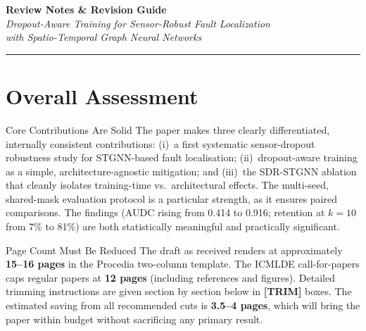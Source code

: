 \documentclass[11pt,a4paper]{article}
\begin{document}
\begin{center}
  {\Large\bfseries Review Notes \& Revision Guide}\\[4pt]
  {\large\itshape Dropout-Aware Training for Sensor-Robust Fault Localization\\
  with Spatio-Temporal Graph Neural Networks}\\[6pt]
\end{center}

\vspace{6pt}
\hrule
\vspace{10pt}

\section{Overall Assessment}

\begin{okbox}{Core Contributions Are Solid}
The paper makes three clearly differentiated, internally consistent contributions:
(i)~a first systematic sensor-dropout robustness study for STGNN-based fault
localisation; (ii)~dropout-aware training as a simple, architecture-agnostic
mitigation; and (iii)~the SDR-STGNN ablation that cleanly isolates training-time
vs.\ architectural effects. The multi-seed, shared-mask evaluation protocol is a
particular strength, as it ensures paired comparisons. The findings (AUDC rising
from 0.414 to 0.916; retention at $k{=}10$ from 7\% to 81\%) are both
statistically meaningful and practically significant.
\end{okbox}

\begin{warnbox}{Page Count Must Be Reduced}
The draft as received renders at approximately \textbf{15--16 pages} in the
Procedia two-column template.  The ICMLDE call-for-papers caps regular papers at
\textbf{12 pages} (including references and figures). Detailed trimming
instructions are given section by section below in
\textcolor{trimviolet}{\textbf{[TRIM]} boxes}. The estimated saving from all
recommended cuts is \textbf{3.5--4 pages}, which will bring the paper within
budget without sacrificing any primary result.
\end{warnbox}
\end{document}

